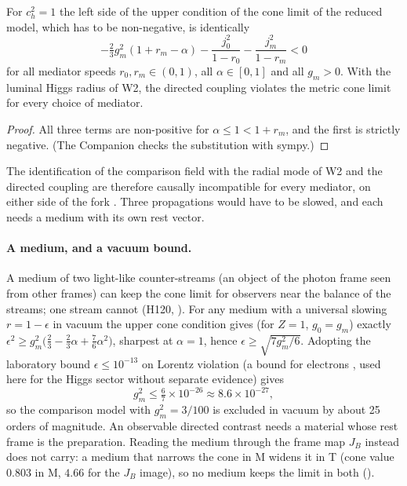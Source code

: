 \begin{proposition}
\label{prop:lop5-nogo}
For $c_h^2=1$ the left side of the upper condition of the cone limit of the reduced model, which has to be non-negative, is identically
\[
 -\tfrac23g_m^2(1+r_m-\alpha)-\frac{j_0^2}{1-r_0}-\frac{j_m^2}{1-r_m}<0
\]
for all mediator speeds $r_0,r_m\in(0,1)$, all $\alpha\in[0,1]$ and all $g_m>0$.  With the luminal Higgs radius of W2, the directed coupling
violates the metric cone limit for every choice of mediator.
\end{proposition}

\begin{proof}
All three terms are non-positive for $\alpha\le1<1+r_m$, and the first is strictly negative.  (The Companion checks the substitution with sympy.)
\end{proof}

The identification of the comparison field with the radial mode of W2 and the directed coupling are therefore causally incompatible for every
mediator, on either side of the fork \Refuted.  Three propagations would have to be slowed, and each needs a medium with its own rest vector.

\paragraph{A medium, and a vacuum bound.}
A medium of two light-like counter-streams (an object of the photon frame seen from other frames) can keep the cone limit for observers near the balance of the streams; one stream cannot
(H120, ).  For any medium with a universal slowing $r=1-\epsilon$ in vacuum the upper cone condition gives (for $Z=1$, $g_0=g_m$) exactly
$\epsilon^2\ge g_m^2\bigl(\tfrac23-\tfrac23\alpha+\tfrac76\alpha^2\bigr)$, sharpest at $\alpha=1$, hence $\epsilon\ge\sqrt{7g_m^2/6}$.  Adopting the
laboratory bound $\epsilon\le10^{-13}$ on Lorentz violation (a bound for electrons \cite{Altschul2010}, used here for the Higgs sector without separate evidence) gives
\begin{equation}
 g_m^2\le\tfrac67\times10^{-26}\approx8.6\times10^{-27},
 \label{eq:lop5-bound}
\end{equation}
so the comparison model with $g_m^2=3/100$ is excluded in vacuum by about 25 orders of magnitude.  An observable directed contrast needs a
material whose rest frame is the preparation.  Reading the medium through the frame map $J_B$ instead does not carry: a medium that narrows the cone
in M widens it in T (cone value $0.803$ in M, $4.66$ for the $J_B$ image), so no medium keeps the limit in both ().

